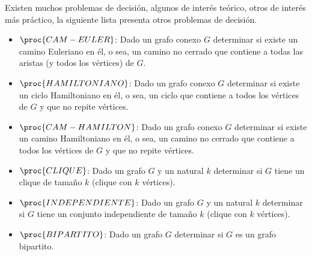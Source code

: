 \begin{ejemplo}
Existen muchos problemas de decisión, algunos de interés teórico, otros de interés más práctico, la siguiente lista presenta otros problemas de decisión.
\begin{itemize}
  \itemsep 0pt
  \item $\proc{CAM-EULER}$: Dado un grafo conexo $G$ determinar si existe un camino Euleriano en él, o sea, un camino no cerrado que contiene a todas las aristas (y todos los vértices) de $G$.
  \item $\proc{HAMILTONIANO}$: Dado un grafo conexo $G$ determinar si existe un ciclo Hamiltoniano en él, o sea, un ciclo que contiene a todos los vértices de $G$ y que no repite vértices.
  \item $\proc{CAM-HAMILTON}$: Dado un grafo conexo $G$ determinar si existe un camino Hamiltoniano en él, o sea, un camino no cerrado que contiene a todos los vértices de $G$ y que no repite vértices.
  \item $\proc{CLIQUE}$: Dado un grafo $G$ y un natural $k$ determinar si $G$ tiene un clique de tamaño $k$ (clique con $k$ vértices).
  \item $\proc{INDEPENDIENTE}$: Dado un grafo $G$ y un natural $k$ determinar si $G$ tiene un conjunto independiente de tamaño $k$ (clique con $k$ vértices).
  \item $\proc{BIPARTITO}$: Dado un grafo $G$ determinar si $G$ es un grafo bipartito.

\end{itemize}
\end{ejemplo}
